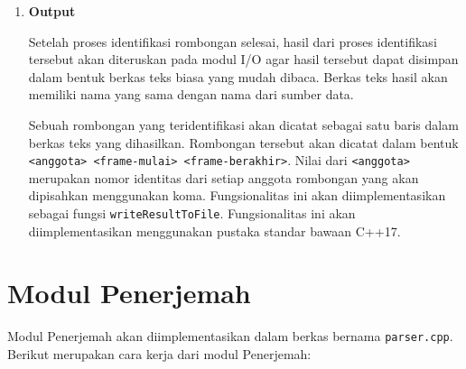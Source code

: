 \begin{enumerate}
    \fi
    
    \item \textbf{Output}
    
    Setelah proses identifikasi rombongan selesai, hasil dari proses identifikasi tersebut akan diteruskan pada modul I/O agar hasil tersebut dapat disimpan dalam bentuk berkas teks biasa yang mudah dibaca. Berkas teks hasil akan memiliki nama yang sama dengan nama dari sumber data. 
    
    Sebuah rombongan yang teridentifikasi akan dicatat sebagai satu baris dalam berkas teks yang dihasilkan. Rombongan tersebut akan dicatat dalam bentuk \texttt{<anggota> <frame-mulai> <frame-berakhir>}. Nilai dari \texttt{<anggota>} merupakan nomor identitas dari setiap anggota rombongan yang akan dipisahkan menggunakan koma. Fungsionalitas ini akan diimplementasikan sebagai fungsi \texttt{writeResultToFile}. Fungsionalitas ini akan diimplementasikan menggunakan pustaka standar bawaan C++17.
\end{enumerate}

\section{Modul Penerjemah}
\label{sec:parser}

Modul Penerjemah akan diimplementasikan dalam berkas bernama \texttt{parser.cpp}. Berikut merupakan cara kerja dari modul Penerjemah:

